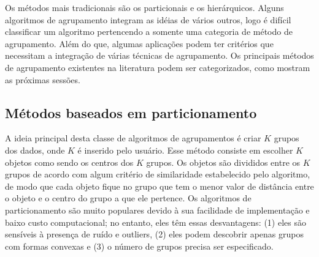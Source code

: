 Os métodos mais tradicionais são os particionais e os hierárquicos. Alguns algoritmos de agrupamento integram as idéias de vários outros, logo é difícil classificar um algoritmo pertencendo a somente uma categoria de método de agrupamento. Além do que, algumas aplicações podem ter critérios que necessitam a integração de várias técnicas de agrupamento.  Os principais métodos de agrupamento existentes na literatura podem ser categorizados, como mostram as próximas sessões.

\subsection{Métodos baseados em particionamento}
A ideia principal desta classe de algoritmos de agrupamentos é criar ${K}$ grupos dos dados, onde ${K}$ é inserido pelo usuário.
Esse método consiste em escolher ${K}$ objetos como sendo os centros dos ${K}$ grupos.
Os objetos são divididos entre os ${K}$ grupos de acordo com algum critério de similaridade
estabelecido pelo algoritmo, de modo que cada objeto fique no grupo que tem o menor valor de
distância entre o objeto e o centro do grupo a que ele pertence.
Os algoritmos de particionamento são muito populares devido à sua facilidade de implementação e baixo custo computacional; no entanto, eles têm essas desvantagens: (1) eles são sensíveis à presença de ruído e outliers, (2) eles podem descobrir apenas grupos com formas convexas e (3) o número de grupos precisa ser especificado.

